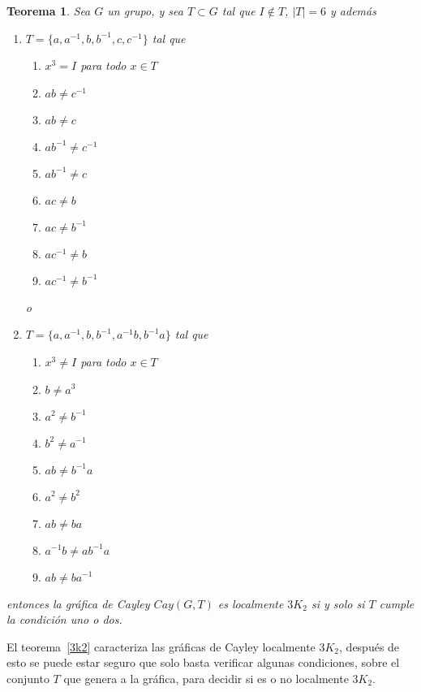 \documentclass[11pt]{book}
\newtheorem{theorem}{Teorema}
\theoremstyle{definition}
\begin{document}
\begin{theorem}
  Sea $G$ un grupo, y sea $T\subset G$ tal que $I\notin T$, $|T|=6$ y
  además

  \begin{enumerate}
  \item $T=\{a, a^{-1},b , b^{-1}, c, c^{-1}\}$ tal que

    \begin{enumerate}
    \item $x^3=I$ para todo $x\in T$
    \item $ab\neq c^{-1}$
    \item $ab\neq c$
    \item $ab^{-1}\neq c^{-1}$
    \item $ab^{-1}\neq c$
    \item $ac\neq b$
    \item $ac\neq b^{-1}$
    \item $ac^{-1}\neq b$
    \item $ac^{-1}\neq b^{-1}$
    \end{enumerate}


    o


  \item $T=\{a, a^{-1}, b, b^{-1}, a^{-1}b, b^{-1}a\}$ tal que

    \begin{enumerate}
    \item $x^3\neq I$ para todo $x\in T$
    \item $b\neq a^3$
    \item $a^2\neq b^{-1}$
    \item $b^2\neq a^{-1}$
    \item $ab\neq b^{-1}a$
    \item $a^2\neq b^2$
    \item $ab\neq ba$
    \item $a^{-1}b\neq ab^{-1}a$
    \item $ab\neq ba^{-1}$
    \end{enumerate}
  \end{enumerate}

  entonces la gráfica de Cayley $Cay(G,T)$ es localmente $3K_2$ si y
  solo si $T$ cumple la condición uno o dos.

\end{theorem}\label{3k2}


El teorema~\ref{3k2} caracteriza las gráficas de Cayley localmente
$3K_2$, después de esto se puede estar seguro que solo basta verificar
algunas condiciones, sobre el conjunto $T$ que genera a la gráfica,
para decidir si es o no localmente $3K_2$.
\end{document}
